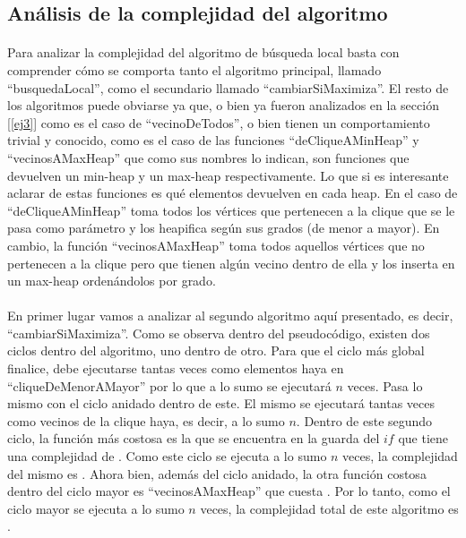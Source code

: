 \vspace{3em}



\normalsize
\subsection{Análisis de la complejidad del algoritmo}
\label{complejidad4}
\paragraph{}
Para analizar la complejidad del algoritmo de búsqueda local basta con comprender cómo se comporta tanto el algoritmo principal, llamado ``busquedaLocal'', como el secundario llamado ``cambiarSiMaximiza''. El resto de los algoritmos puede obviarse ya que, o bien ya fueron analizados en la sección [\ref{ej3}] como es el caso de ``vecinoDeTodos'', o bien tienen un comportamiento trivial y conocido, como es el caso de las funciones ``deCliqueAMinHeap'' y ``vecinosAMaxHeap'' que como sus nombres lo indican, son funciones que devuelven un min-heap y un max-heap respectivamente. Lo que si es interesante aclarar de estas funciones es qué elementos devuelven en cada heap. En el caso de ``deCliqueAMinHeap'' toma todos los vértices que pertenecen a la clique que se le pasa como parámetro y los heapifica según sus grados (de menor a mayor). En cambio, la función ``vecinosAMaxHeap'' toma todos aquellos vértices que no pertenecen a la clique pero que tienen algún vecino dentro de ella y los inserta en un max-heap ordenándolos por grado.

\paragraph{}
En primer lugar vamos a analizar al segundo algoritmo aquí presentado, es decir, ``cambiarSiMaximiza''. Como se observa dentro del pseudocódigo, existen dos ciclos dentro del algoritmo, uno dentro de otro. Para que el ciclo más global finalice, debe ejecutarse tantas veces como elementos haya en ``cliqueDeMenorAMayor'' por lo que a lo sumo se ejecutará $n$ veces. Pasa lo mismo con el ciclo anidado dentro de este. El mismo se ejecutará tantas veces como vecinos de la clique haya, es decir, a lo sumo $n$. Dentro de este segundo ciclo, la función más costosa es la que se encuentra en la guarda del $if$ que tiene una complejidad de . Como este ciclo se ejecuta a lo sumo $n$ veces, la complejidad del mismo es . Ahora bien, además del ciclo anidado, la otra función costosa dentro del ciclo mayor es ``vecinosAMaxHeap'' que cuesta . Por lo tanto, como el ciclo mayor se ejecuta a lo sumo $n$ veces, la complejidad total de este algoritmo es .

